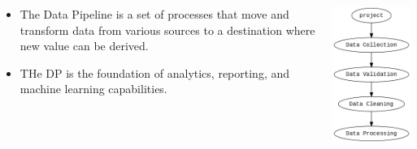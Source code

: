 \documentclass[aspectratio=169]{beamer} %
\begin{document}
\begin{frame}{}
    \begin{columns}
    \begin{column}{0.5\textwidth}
        \begin{itemize}
            \item The Data Pipeline is a set of processes that move and transform data from various sources to a destination where new value can be derived.
            \item THe DP is the foundation of analytics, reporting, and machine learning capabilities.
        \end{itemize}
    \end{column}
    \begin{column}{0.45\textwidth}
        \begin{center}
            \includegraphics[width=1.0\linewidth, height=0.7\textheight]{project.png}
        \end{center}
    \end{column}
\end{columns}
\end{frame}
\end{document}
